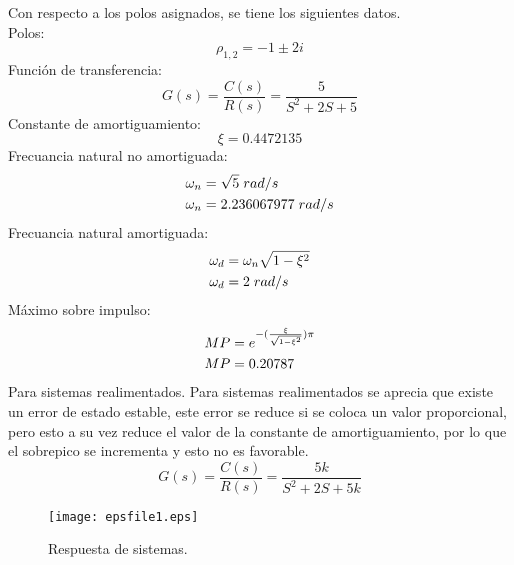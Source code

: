 \documentclass[10pt, a4paper]{report}
\begin{document}
Con respecto a los polos asignados, se tiene los siguientes datos.\\
Polos:
\begin{equation*}
  \rho_{1,2}=-1\pm 2i
\end{equation*}
Función de transferencia:
\begin{equation*}
  G(s)=\frac{C(s)}{R(s)}=\frac{5}{S^2 +2S +5}
\end{equation*}
Constante de amortiguamiento:
\begin{equation*}
  \xi=0.4472135
\end{equation*}
Frecuancia natural no amortiguada:
\begin{equation*}
  \begin{split}
    \omega_{n}&=\sqrt{5}\hspace{0.1cm} rad/s\\
    \omega_{n}&=2.236067977 \hspace{0.1cm} rad/s  
  \end{split}
\end{equation*}
Frecuancia natural amortiguada:
\begin{equation*}
  \begin{split}
    \omega_{d}&= \omega_{n} \sqrt{1-\xi ^2}\\
    \omega_{d}&= 2 \hspace{0.1cm} rad/s
  \end{split}
\end{equation*}
Máximo sobre impulso:
\begin{equation*}
  \begin{split}
    MP &= e^{-(\frac{\xi}{\sqrt{1-\xi^2}})\pi }\\
    MP &= 0.20787 \hspace{0.1cm} 
  \end{split}
\end{equation*}
Para sistemas realimentados.
Para sistemas realimentados se aprecia que existe un error de estado estable, este
error se reduce si se coloca un valor proporcional, pero esto a su vez reduce el
valor de la constante de amortiguamiento, por lo que el sobrepico se incrementa y
esto no es favorable.
\begin{equation*}
  G(s)=\frac{C(s)}{R(s)}=\frac{5k}{S^2 +2S +5k}
\end{equation*}
\begin{figure}[htp]
  \centering
  \texttt{[image: epsfile1.eps]}
  \caption{Respuesta de sistemas.}
  \label{fig:espfig}
\end{figure}
\end{document}
